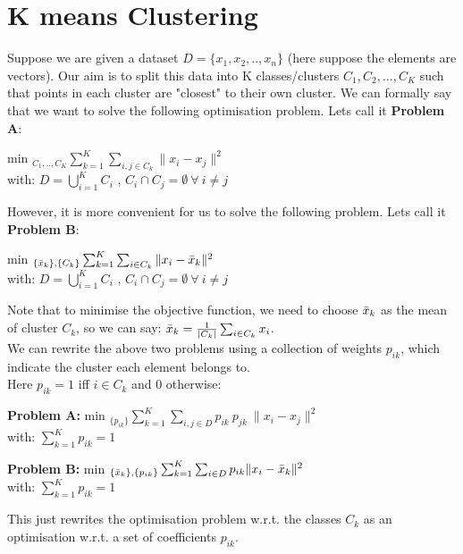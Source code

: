 \documentclass[11pt, twosides]{article}
\begin{document}
\section{K means Clustering}
Suppose we are given a dataset $D=\{x_1,x_2,..,x_n\}$ (here suppose the elements are vectors). Our aim is to split this data into K classes/clusters $C_1, C_2,..., C_K$ such that points in each cluster are "closest" to their own cluster. We can formally say that we want to solve the following optimisation problem. Lets call it {\bf Problem A}:  
\begin{center}
    min $_{C_1,..,C_K}\sum_{k=1}^K\sum_{i,j\in C_k} \|x_i-x_j\|^2 $\\
    with: $D=\bigcup_{i=1}^KC_i$ , $C_i\cap C_j=\emptyset \  \forall \  i\neq j$
\end{center}
However, it is more convenient for us to solve the following problem. Lets call it {\bf Problem B}:

\begin{center}
    min $_{\{ \Bar{x}_k\}, \{C_k\}}\sum_{k=1}^K\sum_{i\in C_k} \|x_i-\Bar{x}_k\|^2 $\\
    with: $D=\bigcup_{i=1}^KC_i$ , $C_i\cap C_j=\emptyset \  \forall \  i\neq j$
\end{center}
Note that to minimise the objective function, we need to choose $\Bar{x}_k$ as the mean of cluster $C_k$, so we can say:  $\Bar{x}_k = \frac{1}{|C_k|}\sum_{i\in C_k} x_i $. \\

We can rewrite the above two problems using a collection of weights $p_{ik}$, which indicate the cluster each element belongs to.\\
Here $p_{ik} = 1$ iff $i \in C_k$ and 0 otherwise:
\begin{center}
    {\bf Problem A:} min $_{ \{p_{ik}\} } \sum_{k=1}^K\sum_{i,j\in D} p_{ik}\  p_{jk}\ \|x_i-x_j\|^2 $\\
    with: $\sum_{k=1}^K p_{ik} = 1$
\end{center}

\begin{center}
    {\bf Problem B:} min $_{\{ \Bar{x}_k\}, \{p_{ik}\} } \sum_{k=1}^K\sum_{i\in D} p_{ik} \|x_i-\Bar{x}_k\|^2 $\\
    with: $\sum_{k=1}^K p_{ik} = 1$
\end{center}

This just rewrites the optimisation problem w.r.t. the classes $C_k$ as an optimisation w.r.t. a set of coefficients $p_{ik}$.\\
\end{document}
